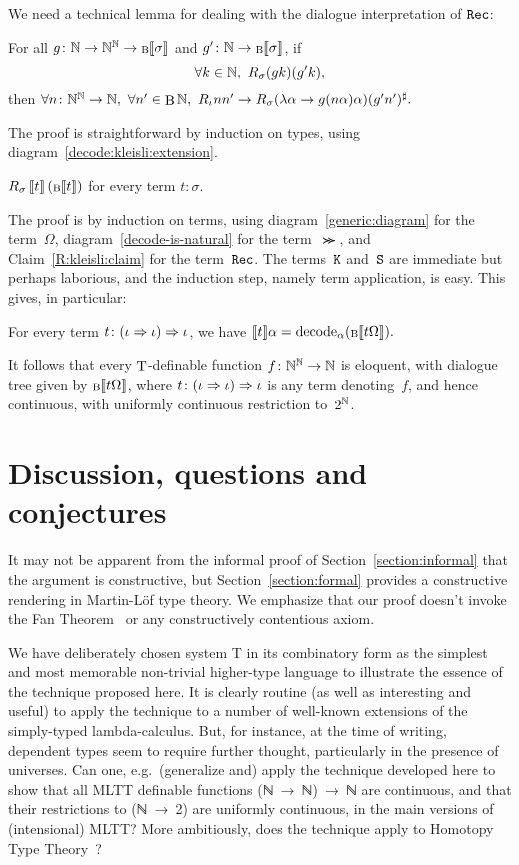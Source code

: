 \documentclass{entcs} \usepackage{prentcsmacro}
\newcommand{\AgdaC}[1]{\mbox{#1}}
\begin{document}
We need a technical lemma for
dealing with the dialogue interpretation of $\mathop{\mathrm{\mathtt{Rec}}}\nolimits$:
\begin{claim} \label{R:kleisli:claim}
For all $g \colon \mathbb{N}  \to \mathbb{N}^{\mathbb{N}} \to {\scriptstyle \mathop{\mathrm{B}}\nolimits}\llbracket \sigma \rrbracket$ and $g' \colon \mathbb{N} \to {\scriptstyle \mathop{\mathrm{B}}\nolimits}\llbracket \sigma \rrbracket$, if
\[
\forall k \in \mathbb{N}, \,\, R_{\sigma} (g k) (g' k),
\]
then
$
\forall n \colon \mathbb{N}^{\mathbb{N}} \to \mathbb{N}, \,\, \forall n' \in \mathop{\mathrm{B}}\nolimits \mathbb{N}, \,\, R_{\iota} n n' \to
R_{\sigma} (\lambda \alpha \to g (n \alpha) \alpha) (g' n')^\sharp.
$
\end{claim}
The proof is straightforward by induction on types, using
diagram~\ref{decode:kleisli:extension}.

\begin{claim}
  $R_\sigma \, \llbracket t \rrbracket \, ({\scriptstyle \mathop{\mathrm{B}}\nolimits}\llbracket t \rrbracket)$ for every term $t \colon \sigma$.
\end{claim}
The proof is by induction on terms, using diagram~\ref{generic:diagram} 
for the term~$\Omega$, diagram~\ref{decode-is-natural} for the term~$\Succ$, 
and Claim~\ref{R:kleisli:claim} for the term~$\mathop{\mathrm{\mathtt{Rec}}}\nolimits$. The terms~$\mathop{\mathrm{\mathtt{K}}}\nolimits$ and~$\mathop{\mathrm{\mathtt{S}}}\nolimits$ are
immediate but perhaps laborious, and the induction step, namely term
application, is easy.  This gives, in particular:
\begin{claim}
  For every term $t \colon (\iota \Rightarrow \iota) \Rightarrow \iota$, we have
  $ \llbracket t \rrbracket \alpha = \mathop{\mathrm{decode}}\nolimits_\alpha ({\scriptstyle \mathop{\mathrm{B}}\nolimits}\llbracket t\Omega \rrbracket).$
\end{claim}
It follows that every $\mathop{\mathrm{T}}\nolimits$-definable function $f \colon \mathbb{N}^{\mathbb{N}} \to \mathbb{N}$ is
eloquent, with dialogue tree given by ${\scriptstyle \mathop{\mathrm{B}}\nolimits}\llbracket t\Omega \rrbracket$, where $t \colon (\iota \Rightarrow \iota) \Rightarrow \iota$ 
is any term denoting~$f$,
and hence continuous, with uniformly continuous restriction to~$2^{\mathbb{N}}$.

\section{Discussion, questions and conjectures}

It may not be apparent from the informal proof of
Section~\ref{section:informal} that the argument is constructive, but
Section~\ref{section:formal} provides a constructive rendering in
Martin-L\"of type theory.  We emphasize that our proof doesn't invoke
the Fan Theorem~\cite{MR0325352,beeson} or any constructively
contentious axiom.

We have deliberately chosen system T in its combinatory form as the
simplest and most memorable non-trivial higher-type language to
illustrate the essence of the technique proposed here. It is clearly
routine (as well as interesting and useful) to apply the technique to
a number of well-known extensions of the simply-typed
lambda-calculus. But, for instance, at the time of writing, dependent
types seem to require further thought, particularly in the presence of
universes. Can one, e.g.\ (generalize and) apply the technique
developed here to show that all MLTT definable functions \AgdaC{(ℕ →
ℕ) → ℕ} are continuous, and that their restrictions to \AgdaC{(ℕ → 2)}
are uniformly continuous, in the main versions of (intensional) MLTT?
More ambitiously, does the technique apply to Homotopy Type
Theory~\cite{HoTTbook}?
\end{document}
